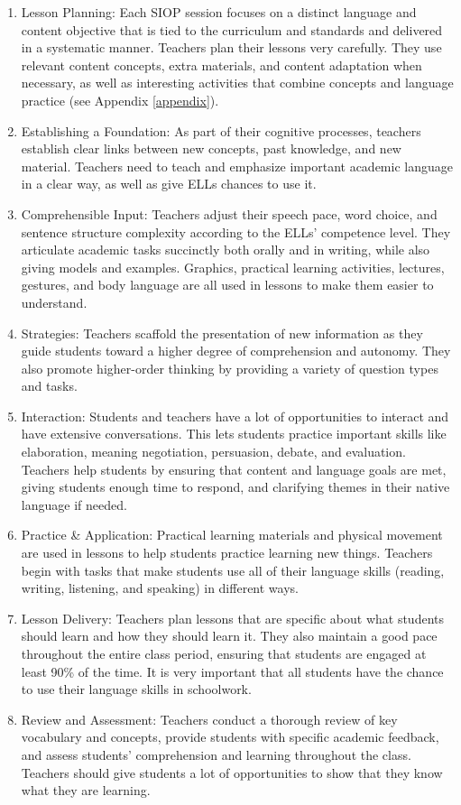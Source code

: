 \documentclass[english]{textolivre}
\begin{document}
\begin{enumerate}
    \item Lesson Planning: Each SIOP session focuses on a distinct language and content objective that is tied to the curriculum and standards and delivered in a systematic manner. Teachers plan their lessons very carefully. They use relevant content concepts, extra materials, and content adaptation when necessary, as well as interesting activities that combine concepts and language practice (see Appendix \ref{appendix}).
    \item Establishing a Foundation: As part of their cognitive processes, teachers establish clear links between new concepts, past knowledge, and new material. Teachers need to teach and emphasize important academic language in a clear way, as well as give ELLs chances to use it.
    \item Comprehensible Input: Teachers adjust their speech pace, word choice, and sentence structure complexity according to the ELLs' competence level. They articulate academic tasks succinctly both orally and in writing, while also giving models and examples. Graphics, practical learning activities, lectures, gestures, and body language are all used in lessons to make them easier to understand.
    \item Strategies: Teachers scaffold the presentation of new information as they guide students toward a higher degree of comprehension and autonomy. They also promote higher-order thinking by providing a variety of question types and tasks.
    \item Interaction: Students and teachers have a lot of opportunities to interact and have extensive conversations. This lets students practice important skills like elaboration, meaning negotiation, persuasion, debate, and evaluation. Teachers help students by ensuring that content and language goals are met, giving students enough time to respond, and clarifying themes in their native language if needed.
    \item Practice \& Application: Practical learning materials and physical movement are used in lessons to help students practice learning new things. Teachers begin with tasks that make students use all of their language skills (reading, writing, listening, and speaking) in different ways.
    \item Lesson Delivery: Teachers plan lessons that are specific about what students should learn and how they should learn it. They also maintain a good pace throughout the entire class period, ensuring that students are engaged at least 90\% of the time. It is very important that all students have the chance to use their language skills in schoolwork.
    \item Review and Assessment: Teachers conduct a thorough review of key vocabulary and concepts, provide students with specific academic feedback, and assess students' comprehension and learning throughout the class. Teachers should give students a lot of opportunities to show that they know what they are learning.
\end{enumerate}
\end{document}
